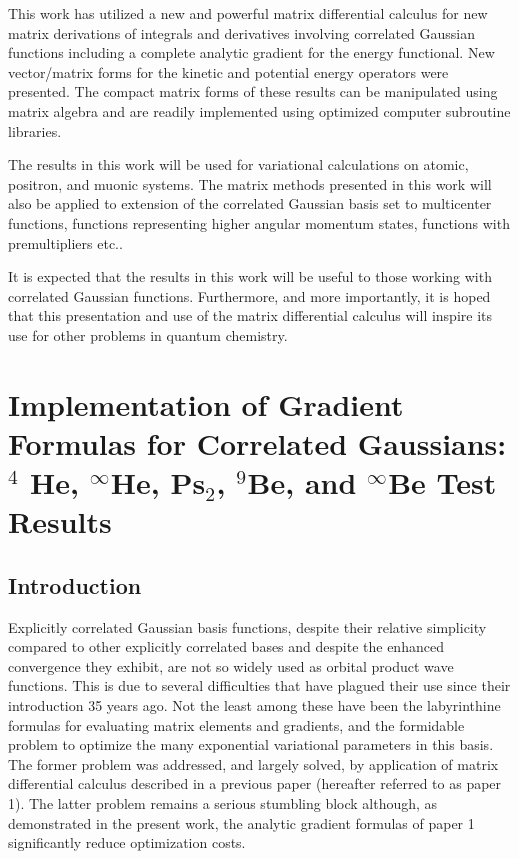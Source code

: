 \documentclass[12pt,thmsa,suthesis,verbatim]{report}
\begin{document}
This work has utilized a new and powerful matrix differential calculus for
new matrix derivations of integrals and derivatives involving correlated
Gaussian functions including a complete analytic gradient for the energy
functional. New vector/matrix forms for the kinetic and potential energy
operators were presented. The compact matrix forms of these results can be
manipulated using matrix algebra and are readily implemented using optimized
computer subroutine libraries.

The results in this work will be used for variational calculations on
atomic, positron, and muonic systems. The matrix methods presented in this
work will also be applied to extension of the correlated Gaussian basis set
to multicenter functions, functions representing higher angular momentum
states, functions with premultipliers etc..

It is expected that the results in this work will be useful to those working
with correlated Gaussian functions. Furthermore, and more importantly, it is
hoped that this presentation and use of the matrix differential calculus
will inspire its use for other problems in quantum chemistry.

\chapter{Implementation of Gradient Formulas for Correlated Gaussians: $^4$%
He, $^\infty $He, Ps$_2$, $^9$Be, and $^\infty $Be Test Results}

\newpage 

\section{Introduction}

Explicitly correlated Gaussian basis functions, despite their relative
simplicity compared to other explicitly correlated bases and despite the
enhanced convergence they exhibit, are not so widely used as orbital product
wave functions. This is due to several difficulties that have plagued their
use since their introduction 35 years ago. Not the least among these have
been the labyrinthine formulas for evaluating matrix elements and gradients,
and the formidable problem to optimize the many exponential variational
parameters in this basis. The former problem was addressed, and largely
solved, by application of matrix differential calculus described in a
previous paper (hereafter referred to as paper 1\cite{Kinghorn95a}). The
latter problem remains a serious stumbling block although, as demonstrated
in the present work, the analytic gradient formulas of paper 1\cite
{Kinghorn95a} significantly reduce optimization costs.
\end{document}
